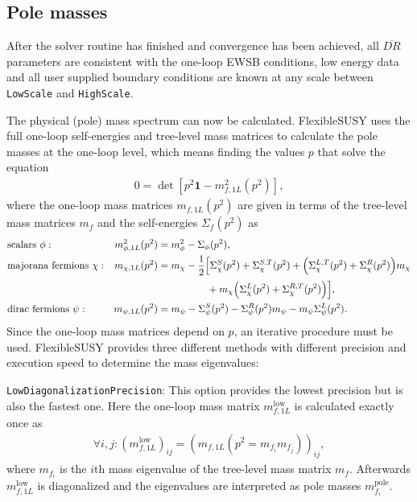 \documentclass[final,3p,times,pdflatex]{elsarticle}
\newcommand{\fs}{FlexibleSUSY\xspace}
\newcommand{\code}[1]{\lstinline|#1|}  %
\newcommand{\pole}{\text{pole}}
\newcommand{\unity}{\mathbf{1}}
\begin{document}
\subsection{Pole masses}
After the solver routine has finished and convergence has been
achieved, all $\overline{DR}$ parameters are consistent with the
one-loop EWSB conditions, low energy data and all user supplied
boundary conditions are known at any scale between \code{LowScale} and
\code{HighScale}.

The physical (pole) mass spectrum can now be calculated.  \fs uses the
full one-loop self-energies and tree-level mass matrices to calculate
the pole masses at the one-loop level, which means finding the values
$p$ that solve the equation
%
\begin{align}
  0 = \det\left[p^2\unity - m^2_{f,1L}(p^2)\right],
\end{align}
%
where the one-loop mass matrices $m_{f,1L}(p^2)$ are given in terms of
the tree-level mass matrices $m_f$ and the self-energies
$\Sigma_f(p^2)$ as
%
\begin{align}
  &\text{scalars } \phi: &
  m^2_{\phi,1L}(p^2) &= m^2_{\phi} - \Sigma_\phi(p^2), \\
  &\text{majorana fermions } \chi: &
  m_{\chi,1L}(p^2) &= m_{\chi} - \frac{1}{2}\Big[
    \Sigma_\chi^S(p^2) + \Sigma_\chi^{S,T}(p^2)
    + \Big( \Sigma_\chi^{L,T}(p^2) + \Sigma_\chi^R(p^2) \Big) m_{\chi} \notag \\
    &&&\phantom{= m_{\chi} - \frac{1}{2}\Big[}
    + m_{\chi} \Big( \Sigma_\chi^L(p^2) + \Sigma_\chi^{R,T}(p^2) \Big)
  \Big], \\
  &\text{dirac fermions } \psi: &
  m_{\psi,1L}(p^2) &= m_{\psi}
  - \Sigma_\psi^S(p^2)
  - \Sigma_\psi^R(p^2) m_{\psi}
  - m_{\psi} \Sigma_\psi^L(p^2) .
\end{align}
%
Since the one-loop mass matrices depend on $p$, an iterative procedure
must be used.  \fs provides three different methods with different
precision and execution speed to determine the mass eigenvalues:

\code{LowDiagonalizationPrecision}: This option provides the lowest
precision but is also the fastest one.  Here the one-loop mass matrix
$m_{f,1L}^\text{low}$ is calculated exactly once as
%
\begin{align}
  \forall i,j: (m_{f,1L}^\text{low})_{ij} = (m_{f,1L}(p^2 = m_{f_i} m_{f_j}))_{ij} ,
\end{align}
%
where $m_{f_i}$ is the $i$th mass eigenvalue of the tree-level mass
matrix $m_f$.  Afterwards $m_{f,1L}^\text{low}$ is diagonalized and
the eigenvalues are interpreted as pole masses $m_{f_i}^\pole$.
\end{document}
